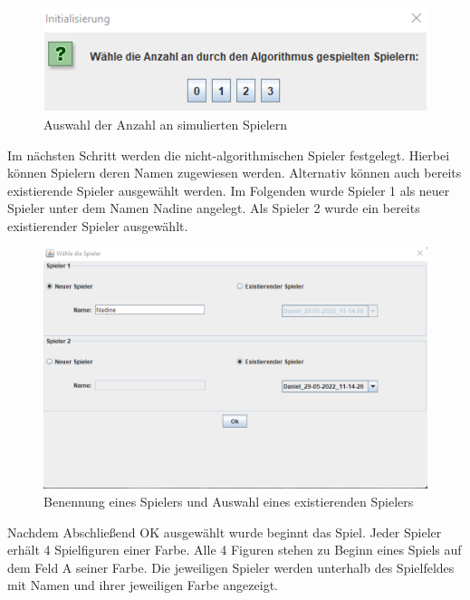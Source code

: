 \begin{figure}[htbp]
\centering
\centerline{\includegraphics[scale=.5]{anleitung2}}
\caption{Auswahl der Anzahl an simulierten Spielern}
\label{fig:anleitung2}
\end{figure}

\noindent Im nächsten Schritt werden die nicht-algorithmischen Spieler festgelegt. Hierbei können Spielern deren Namen zugewiesen werden. Alternativ können auch bereits existierende Spieler ausgewählt werden. Im Folgenden wurde Spieler 1 als neuer Spieler unter dem Namen Nadine angelegt. Als Spieler 2 wurde ein bereits existierender Spieler ausgewählt.

\newpage


\begin{figure}[htbp]
\centering
\centerline{\includegraphics[scale=.6]{anleitung4}}
\caption{Benennung eines Spielers und Auswahl eines existierenden Spielers}
\label{fig:anleitung4}
\end{figure}

\noindent Nachdem Abschließend OK ausgewählt wurde beginnt das Spiel. Jeder Spieler erhält 4 Spielfiguren einer Farbe. Alle 4 Figuren stehen zu Beginn eines Spiels auf dem Feld A seiner Farbe. Die jeweiligen Spieler werden unterhalb des Spielfeldes mit Namen und ihrer jeweiligen Farbe angezeigt.

